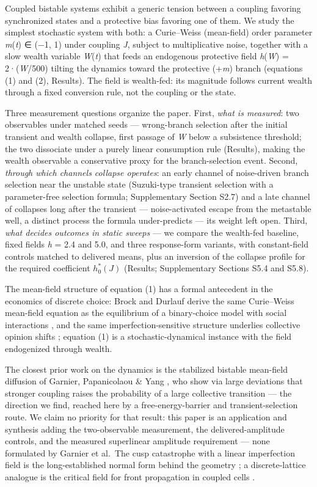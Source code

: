 \documentclass[11pt,letterpaper]{article}
\newcounter{none}
\begin{document}
Coupled bistable systems exhibit a generic tension between a coupling favoring synchronized states and a protective bias favoring one of them. We study the simplest stochastic system with both: a Curie--Weiss (mean-field) order parameter \emph{m}(\emph{t}) ∈ (−1, 1) under coupling \emph{J}, subject to multiplicative noise, together with a slow wealth variable \emph{W}(\emph{t}) that feeds an endogenous protective field \emph{h}(\emph{W}) = 2·(\emph{W}/500) tilting the dynamics toward the protective (+\emph{m}) branch (equations (1) and (2), Results). The field is wealth-fed: its magnitude follows current wealth through a fixed conversion rule, not the coupling or the state.

Three measurement questions organize the paper. First, \emph{what is measured}: two observables under matched seeds --- wrong-branch selection after the initial transient and wealth collapse, first passage of \emph{W} below a subsistence threshold; the two dissociate under a purely linear consumption rule (Results), making the wealth observable a conservative proxy for the branch-selection event. Second, \emph{through which channels collapse operates}: an early channel of noise-driven branch selection near the unstable state (Suzuki-type transient selection \cite{suzuki1977} with a parameter-free selection formula; Supplementary Section S2.7) and a late channel of collapses long after the transient --- noise-activated escape from the metastable well, a distinct process the formula under-predicts --- its weight left open. Third, \emph{what decides outcomes in static sweeps} --- we compare the wealth-fed baseline, fixed fields \emph{h} = 2.4 and 5.0, and three response-form variants, with constant-field controls matched to delivered means, plus an inversion of the collapse profile for the required coefficient \(h_0^*(J)\) (Results; Supplementary Sections S5.4 and S5.8).

The mean-field structure of equation (1) has a formal antecedent in the economics of discrete choice: Brock and Durlauf derive the same Curie--Weiss mean-field equation as the equilibrium of a binary-choice model with social interactions \cite{brockdurlauf2001,blume1993}, and the same imperfection-sensitive structure underlies collective opinion shifts \cite{michardbouchaud2005}; equation (1) is a stochastic-dynamical instance with the field endogenized through wealth.

The closest prior work on the dynamics is the stabilized bistable mean-field diffusion of Garnier, Papanicolaou \& Yang \cite{garnier2013}, who show via large deviations that stronger coupling raises the probability of a large collective transition --- the direction we find, reached here by a free-energy-barrier and transient-selection route. We claim no priority for that result: this paper is an application and synthesis adding the two-observable measurement, the delivered-amplitude controls, and the measured superlinear amplitude requirement --- none formulated by Garnier et al.~The cusp catastrophe with a linear imperfection field is the long-established normal form behind the geometry \cite{postonstewart1978}; a discrete-lattice analogue is the critical field for front propagation in coupled cells \cite{kladko2000}.
\end{document}
